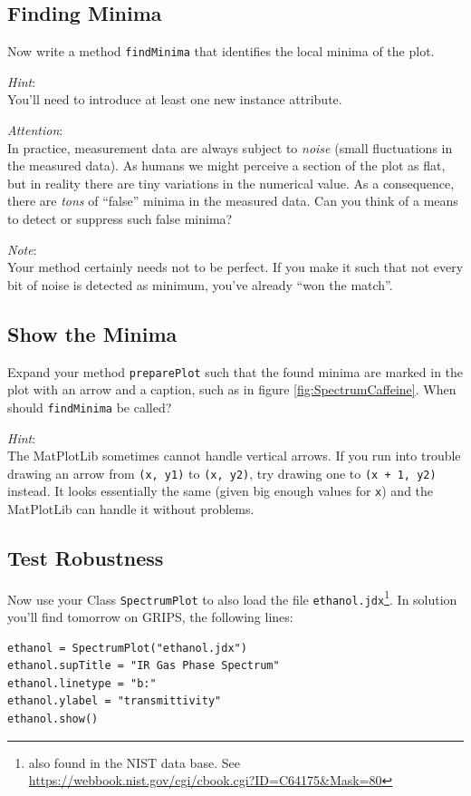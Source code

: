 \documentclass[
	english,
	fontsize=10pt,
	parskip=half,
	titlepage=true,
	DIV=12
]{scrartcl}
\begin{document}
\subsection{Finding Minima}
Now write a method \texttt{findMinima} that identifies the local minima of the plot.

\emph{Hint}:\\
You'll need to introduce at least one new instance attribute.

\emph{Attention}:\\
In practice, measurement data are always subject to \emph{noise} (small fluctuations in the measured data). As humans we might perceive a section of the plot as flat, but in reality there are tiny variations in the numerical value. As a consequence, there are \emph{tons} of \enquote{false} minima in the measured data. Can you think of a means to detect or suppress such false minima?

\emph{Note}:\\
Your method certainly needs not to be perfect. If you make it such that not every bit of noise is detected as minimum, you've already \enquote{won the match}.

\subsection{Show the Minima}
Expand your method \texttt{preparePlot} such that the found minima are marked in the plot with an arrow and a caption, such as in figure \ref{fig:SpectrumCaffeine}. When should \texttt{findMinima} be called?

\emph{Hint}:\\
The MatPlotLib sometimes cannot handle vertical arrows. If you run into trouble drawing an arrow from \texttt{(x, y1)} to \texttt{(x, y2)}, try drawing one to \texttt{(x + 1, y2)} instead. It looks essentially the same (given big enough values for \texttt{x}) and the MatPlotLib can handle it without problems.

\subsection{Test Robustness}
Now use your Class \texttt{SpectrumPlot} to also load the file \texttt{ethanol.jdx}\footnote{also found in the NIST data base. See \url{https://webbook.nist.gov/cgi/cbook.cgi?ID=C64175&Mask=80}}. In solution you'll find tomorrow on GRIPS, the following lines:
\begin{verbatim}
ethanol = SpectrumPlot("ethanol.jdx")
ethanol.supTitle = "IR Gas Phase Spectrum"
ethanol.linetype = "b:"
ethanol.ylabel = "transmittivity"
ethanol.show()
\end{verbatim}
\end{document}
